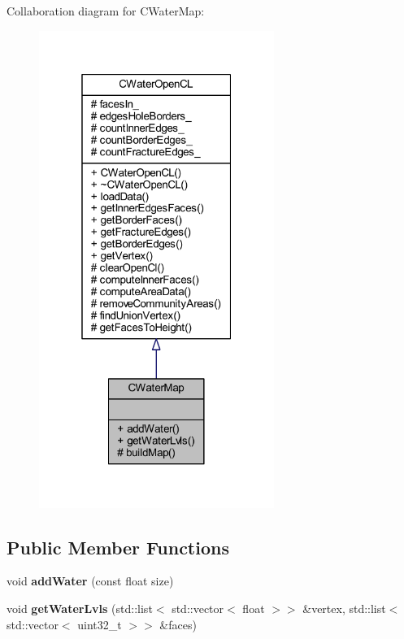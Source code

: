 Collaboration diagram for C\+Water\+Map\+:
\nopagebreak
\begin{figure}[H]
\begin{center}
\leavevmode
\includegraphics[width=217pt]{class_c_water_map__coll__graph}
\end{center}
\end{figure}
\subsection*{Public Member Functions}
\begin{DoxyCompactItemize}
\item 
\mbox{\label{class_c_water_map_a99ee0ad6fdbf8f07617d4f5b4c759bcd}} 
void {\bfseries add\+Water} (const float size)
\item 
\mbox{\label{class_c_water_map_aca1fa16390fe2a39e4d576045f3404e9}} 
void {\bfseries get\+Water\+Lvls} (std\+::list$<$ std\+::vector$<$ float $>$$>$ \&vertex, std\+::list$<$ std\+::vector$<$ uint32\+\_\+t $>$$>$ \&faces)
\end{DoxyCompactItemize}
